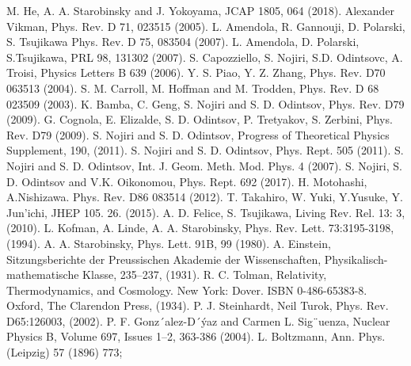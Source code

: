 \documentclass[a4paper,11pt]{article}
\begin{document}
\begin{thebibliography}{99}
M. He, A. A. Starobinsky and J. Yokoyama, JCAP 1805,  064 (2018).
Alexander Vikman,  Phys. Rev. D 71, 023515 (2005).
L. Amendola, R. Gannouji, D. Polarski, S. Tsujikawa Phys. Rev. D 75, 083504 (2007).
L. Amendola, D. Polarski, S.Tsujikawa, PRL 98, 131302 (2007).
S. Capozziello, S. Nojiri, S.D. Odintsovc, A. Troisi, Physics Letters B 639 (2006). %
Y. S. Piao, Y. Z. Zhang, Phys. Rev. D70 063513 (2004).
S. M. Carroll, M. Hoffman and M. Trodden, Phys. Rev. D 68 023509 (2003).
K. Bamba, C. Geng, S. Nojiri and S. D. Odintsov, Phys. Rev. D79 (2009).
G. Cognola, E. Elizalde, S. D. Odintsov, P. Tretyakov, S. Zerbini, Phys. Rev. D79 (2009).
S. Nojiri and  S. D. Odintsov, Progress of Theoretical Physics Supplement, 190, (2011). S. Nojiri and  S. D. Odintsov, Phys. Rept. 505 (2011).
S. Nojiri and S. D. Odintsov, Int. J. Geom. Meth. Mod. Phys. 4 (2007).
S. Nojiri, S. D. Odintsov and V.K. Oikonomou, Phys. Rept. 692 (2017).
 H. Motohashi, A.Nishizawa. Phys. Rev. D86 083514 (2012).
T. Takahiro, W. Yuki, Y.Yusuke, Y. Jun'ichi, JHEP 105. 26.  (2015).
A. D. Felice, S. Tsujikawa, Living Rev. Rel. 13: 3, (2010).
L. Kofman, A. Linde, A. A. Starobinsky, Phys. Rev. Lett. 73:3195-3198, (1994).
A. A. Starobinsky, Phys. Lett. 91B, 99 (1980).
A. Einstein, Sitzungsberichte der Preussischen Akademie der Wissenschaften, Physikalisch-mathematische Klasse,  235–237, (1931).
R. C. Tolman, Relativity, Thermodynamics, and Cosmology. New York: Dover. ISBN 0-486-65383-8. Oxford, The Clarendon Press, (1934).
P. J. Steinhardt, Neil Turok, Phys. Rev. D65:126003, (2002).
P. F. Gonz´alez-D´ýaz and Carmen L. Sig¨uenza, Nuclear Physics B, Volume 697, Issues 1–2, 363-386 (2004).
L. Boltzmann, Ann. Phys. (Leipzig) 57 (1896) 773;

\end{thebibliography}
\end{document}
